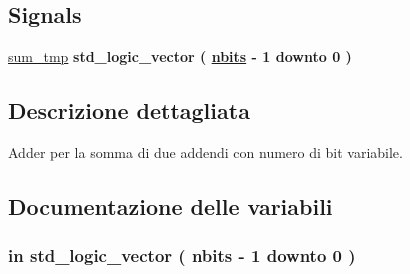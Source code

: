 \subsection*{Signals}
 \begin{DoxyCompactItemize}
\item 
\hyperlink{group___adder_ga590914af948ec283f1371002f2f76720}{sum\+\_\+tmp} {\bfseries \textcolor{vhdlchar}{std\+\_\+logic\+\_\+vector}\textcolor{vhdlchar}{ }\textcolor{vhdlchar}{(}\textcolor{vhdlchar}{ }\textcolor{vhdlchar}{ }\textcolor{vhdlchar}{ }\textcolor{vhdlchar}{ }{\bfseries \hyperlink{group___adder_gae1435c07d0cd54b521535e2f8de6f94e}{nbits}} \textcolor{vhdlchar}{-\/}\textcolor{vhdlchar}{ } \textcolor{vhdldigit}{1} \textcolor{vhdlchar}{ }\textcolor{vhdlchar}{downto}\textcolor{vhdlchar}{ }\textcolor{vhdlchar}{ } \textcolor{vhdldigit}{0} \textcolor{vhdlchar}{ }\textcolor{vhdlchar}{)}\textcolor{vhdlchar}{ }} 
\end{DoxyCompactItemize}


\subsection{Descrizione dettagliata}
Adder per la somma di due addendi con numero di bit variabile. 



\subsection{Documentazione delle variabili}
\subsubsection[{\texorpdfstring{add1}{add1}}]{ {\bfseries \textcolor{vhdlchar}{in}\textcolor{vhdlchar}{ }} {\bfseries \textcolor{vhdlchar}{std\+\_\+logic\+\_\+vector}\textcolor{vhdlchar}{ }\textcolor{vhdlchar}{(}\textcolor{vhdlchar}{ }\textcolor{vhdlchar}{ }\textcolor{vhdlchar}{ }\textcolor{vhdlchar}{ }{\bfseries {\bf nbits}} \textcolor{vhdlchar}{-\/}\textcolor{vhdlchar}{ } \textcolor{vhdldigit}{1} \textcolor{vhdlchar}{ }\textcolor{vhdlchar}{downto}\textcolor{vhdlchar}{ }\textcolor{vhdlchar}{ } \textcolor{vhdldigit}{0} \textcolor{vhdlchar}{ }\textcolor{vhdlchar}{)}\textcolor{vhdlchar}{ }} \hspace{0.3cm}{\ttfamily [Port]}}\hypertarget{group___adder_gad6ed6073f8ded668a403a0f7d85c53e8}{}\label{group___adder_gad6ed6073f8ded668a403a0f7d85c53e8}


